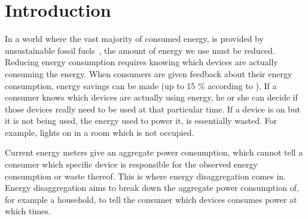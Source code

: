
\chapter{Introduction}
\label{chp:introduction}

\vspace{1\baselineskip}

\noindent


In a world where the vast majority of consumed energy, is provided by unsustainable fossil fuels~\cite{kolter2011redd}, the amount of energy we use must be reduced.
Reducing energy consumption requires knowing which devices are actually consuming the energy.
When consumers are given feedback about their energy consumption, energy savings can be made (up to 15 \% according to \cite{darby2006effectiveness}).
If a consumer knows which devices are actually using energy, he or she can decide if those devices really need to be used at that particular time.
If a device is on but it is not being used, the energy used to power it, is essentially wasted.
For example, lights on in a room which is not occupied.



Current energy meters give an aggregate power consumption, which cannot tell a consumer which specific device is responsible for the observed energy consumption or waste thereof.
This is where energy disaggregation comes in.
Energy disaggregation aims to break down the aggregate power consumption of, for example a household, to tell the consumer which devices consumes power at which times.




